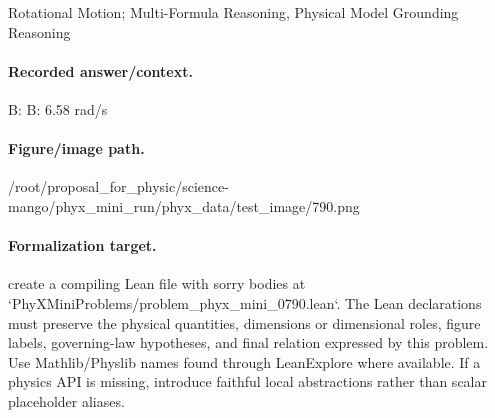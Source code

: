 Rotational Motion; Multi-Formula Reasoning, Physical Model Grounding Reasoning

\paragraph{Recorded answer/context.}
B: B: 6.58 rad/s

\paragraph{Figure/image path.}
/root/proposal\_for\_physic/science-mango/phyx\_mini\_run/phyx\_data/test\_image/790.png

\paragraph{Formalization target.}
create a compiling Lean file with sorry bodies at `PhyXMiniProblems/problem\_phyx\_mini\_0790.lean`. The Lean declarations must preserve the physical quantities, dimensions or dimensional roles, figure labels, governing-law hypotheses, and final relation expressed by this problem.
Use Mathlib/Physlib names found through LeanExplore where available. If a physics API is missing, introduce faithful local abstractions rather than scalar placeholder aliases.

